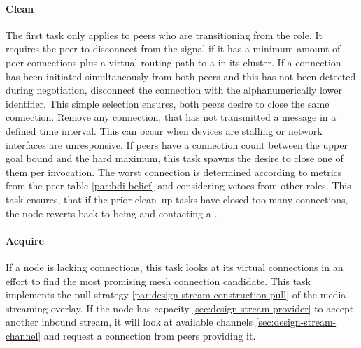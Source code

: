 \paragraph{Clean}
\begin{itemize}
     The first task only applies to peers who are transitioning from the \newbieRole role. It requires the peer to disconnect from the signal if it has a minimum amount of peer connections plus a virtual routing path to a \routerRole in its cluster.
     If a connection has been initiated simultaneously from both peers and this has not been detected during negotiation, disconnect the connection with the alphanumerically lower identifier. This simple selection ensures, both peers desire to close the same connection.
     Remove any connection, that has not transmitted a message in a defined time interval. This can occur when devices are stalling or network interfaces are unresponsive.
     If peers have a connection count between the upper goal bound and the hard maximum, this task spawns the desire to close one of them per invocation. The worst connection is determined according to metrics from the peer table \cref{par:bdi-belief} and considering vetoes from other roles.
     This task ensures, that if the prior clean–up tasks have closed too many connections, the node reverts back to being \newbieRole and contacting a \signalRole.
\end{itemize}

\paragraph{Acquire}
\begin{itemize}
     If a node is lacking connections, this task looks at its virtual connections in an effort to find the most promising mesh connection candidate.
     This task implements the pull strategy \cref{par:design-stream-construction-pull} of the media streaming overlay. If the node has capacity \cref{sec:design-stream-provider} to accept another inbound stream, it will look at available channels \cref{sec:design-stream-channel} and request a connection from peers providing it.
\end{itemize}

